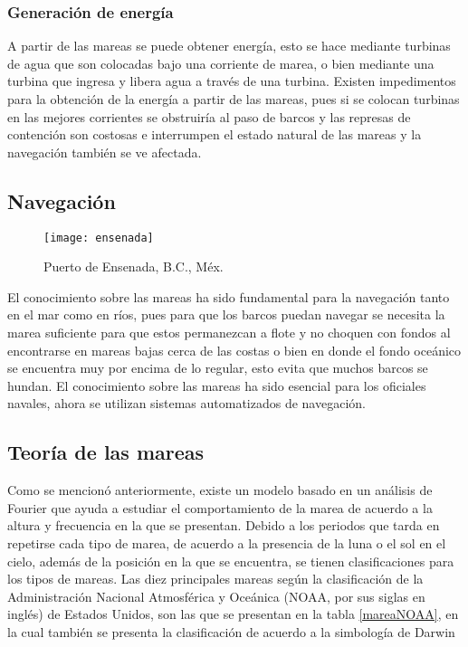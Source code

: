 \subsubsection{Generación de energía}
A partir de las mareas se puede obtener energía, esto se hace mediante turbinas de agua que son colocadas bajo una corriente de marea, o bien mediante una turbina que ingresa y libera agua a través de una turbina. Existen impedimentos para la obtención de la energía a partir de las mareas, pues si se colocan turbinas en las mejores corrientes se obstruiría al paso de barcos y las represas de contención son costosas e interrumpen el estado natural de las mareas y la navegación también se ve afectada.

\pagebreak
\subsection{Navegación}

\begin{wrapfigure}{r}{0.5\textwidth}
\centering
\texttt{[image: ensenada]}
\caption{Puerto de Ensenada, B.C., Méx.}
\end{wrapfigure}

El conocimiento sobre las mareas ha sido fundamental para la navegación tanto en el mar como en ríos, pues para que los barcos puedan navegar se necesita la marea suficiente para que estos permanezcan a flote y no choquen con fondos al encontrarse en mareas bajas cerca de las costas o bien en donde el fondo oceánico se encuentra muy por encima de lo regular, esto evita que muchos barcos se hundan. El conocimiento sobre las mareas ha sido esencial para los oficiales navales, ahora se utilizan sistemas automatizados de navegación.

\subsection{Teoría de las mareas}
Como se mencionó anteriormente, existe un modelo basado en un análisis de Fourier que ayuda a estudiar el comportamiento de la marea de acuerdo a la altura y frecuencia en la que se presentan. Debido a los periodos que tarda en repetirse cada tipo de marea, de acuerdo a la presencia de la luna o el sol en el cielo, además de la posición en la que se encuentra, se tienen clasificaciones para los tipos de mareas. Las diez principales mareas según la clasificación de la Administración Nacional Atmosférica y Oceánica (NOAA, por sus siglas en inglés) de Estados Unidos, son las que se presentan en la tabla \ref{mareaNOAA}, en la cual también se presenta la clasificación de acuerdo a la simbología de Darwin

